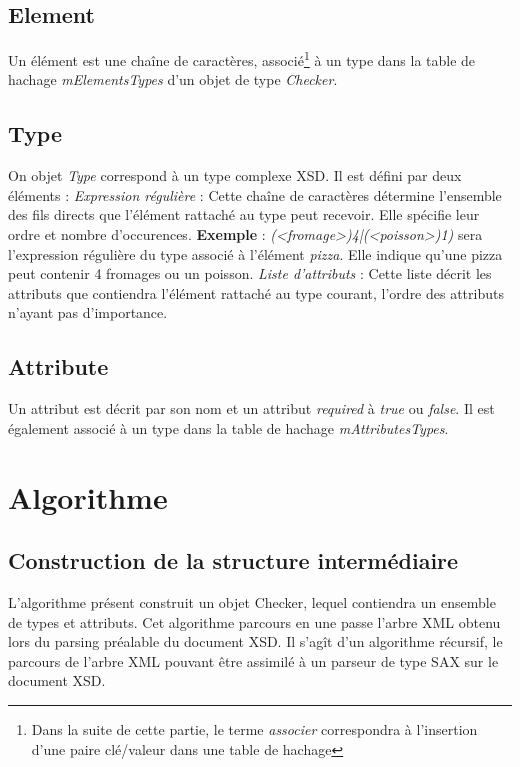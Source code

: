 	\subsection{Element}
		Un élément est une chaîne de caractères, associé\footnote{Dans la suite de cette partie, le terme \textit{associer} correspondra à l'insertion d'une paire clé/valeur dans une table de hachage} à un type dans la table de hachage \textit{mElementsTypes} d'un objet de type \textit{Checker}.

	\subsection{Type}
		On objet \textit{Type} correspond à un type complexe XSD. Il est défini par deux éléments :
		\textit{Expression régulière} : Cette chaîne de caractères détermine l'ensemble des fils directs que l'élément rattaché au type peut recevoir. Elle spécifie leur ordre et nombre d'occurences.
			\textbf{Exemple} : \textit{(<fromage>){4}|(<poisson>){1})} sera l'expression régulière du type associé à l'élément \textit{pizza}.
			Elle indique qu'une pizza peut contenir 4 fromages ou un poisson.
		\textit{Liste d'attributs} : Cette liste décrit les attributs que contiendra l'élément rattaché au type courant, l'ordre des attributs n'ayant pas d'importance.
		
	\subsection{Attribute}
		Un attribut est décrit par son nom et un attribut \textit{required} à \textit{true} ou \textit{false}. Il est également associé à un type dans la table de hachage \textit{mAttributesTypes}.

\section{Algorithme}

\subsection{Construction de la structure intermédiaire}
L'algorithme présent construit un objet Checker, lequel contiendra un ensemble de types et attributs.
Cet algorithme parcours en une passe l'arbre XML obtenu lors du parsing préalable du document XSD.
Il s'agît d'un algorithme récursif, le parcours de l'arbre XML pouvant être assimilé à un parseur de type SAX sur le document XSD.

